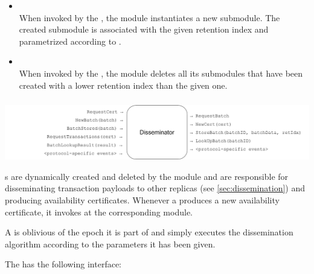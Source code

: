 \documentclass{article}
\begin{document}
\begin{itemize}

    \item {}\\
    When invoked by the , the  module instantiates a new  submodule.
    The created submodule is associated with the given retention index and parametrized according to .

    \item {}\\
    When invoked by the ,
    the  module deletes all its submodules that have been created with a lower retention index than the given one.

\end{itemize}

\subsubsection{}

\includegraphics[width=\textwidth]{figures/modules/module-disseminator.pdf}

s are dynamically created and deleted by the  module
and are responsible for disseminating transaction payloads to other replicas (see \cref{sec:dissemination})
and producing availability certificates.
Whenever a  produces a new availability certificate, it invokes  at the corresponding  module.

A  is oblivious of the epoch it is part of
and simply executes the dissemination algorithm according to the parameters it has been given.

The  has the following interface:
\end{document}
